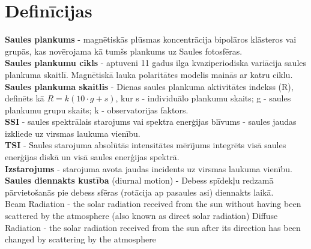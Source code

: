 \section{Definīcijas}
\noindent \textbf{Saules plankums} - magnētiskās plūsmas koncentrācija bipolāros klāsteros vai grupās, kas novērojama kā tumšs plankums uz Saules fotosfēras.\\
\textbf{Saules plankumu cikls} - aptuveni 11 gadus ilga kvaziperiodiska variācija saules plankuma skaitlī. Magnētiskā lauka polaritātes modelis mainās ar katru ciklu.\\
\textbf{Saules plankuma skaitlis} - Dienas saules plankuma aktivitātes indekss (R), definēts kā $R = k(10 \cdot g + s)$, kur
s - individuālo plankumu skaits;
g - saules plankumu grupu skaits;
k - observatorijas faktors.\\
\textbf{SSI} - saules spektrālais starojums vai spektra enerģijas blīvums - saules jaudas izkliede uz virsmas laukuma vienību.\\
\textbf{TSI} - Saules starojuma absolūtās intensitātes mērījums integrēts visā saules enerģijas diskā un visā saules enerģijas spektrā.\\
\textbf{Izstarojums} - starojuma avota jaudas incidents uz virsmas laukuma vienību.\\ %
\textbf{Saules diennakts kustība} (diurnal motion) - Debess spīdekļu redzamā pārvietošanās pie debess sfēras (rotācija ap pasaules asi) diennakts laikā.\\ %
Beam Radiation - the solar radiation received from the sun without having been scattered by the atmosphere (also known as direct solar radiation)
Diffuse Radiation - the solar radiation received from the sun after its direction has been changed by scattering by the atmosphere